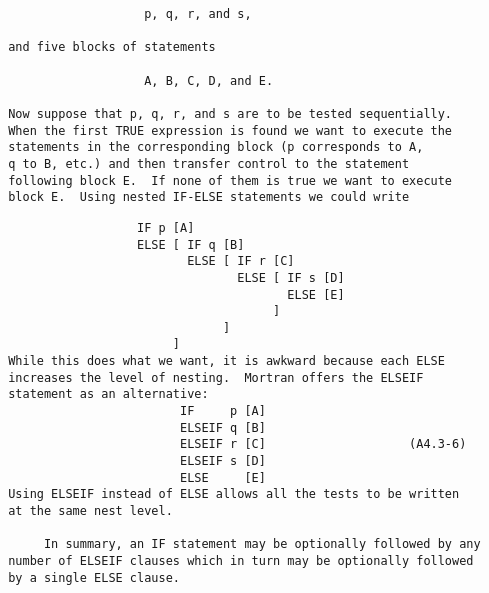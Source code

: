 \begin{verbatim}
                    p, q, r, and s,
 
 and five blocks of statements
 
                    A, B, C, D, and E.
 
 Now suppose that p, q, r, and s are to be tested sequentially.
 When the first TRUE expression is found we want to execute the
 statements in the corresponding block (p corresponds to A,
 q to B, etc.) and then transfer control to the statement
 following block E.  If none of them is true we want to execute
 block E.  Using nested IF-ELSE statements we could write
 \end{verbatim}
\newpage
 \begin{verbatim}
                   IF p [A]
                   ELSE [ IF q [B]
                          ELSE [ IF r [C]
                                 ELSE [ IF s [D]
                                        ELSE [E]
                                      ]
                               ]
                        ]
 While this does what we want, it is awkward because each ELSE
 increases the level of nesting.  Mortran offers the ELSEIF
 statement as an alternative:
                         IF     p [A]
                         ELSEIF q [B]
                         ELSEIF r [C]                    (A4.3-6)
                         ELSEIF s [D]
                         ELSE     [E]
 Using ELSEIF instead of ELSE allows all the tests to be written
 at the same nest level.
 
      In summary, an IF statement may be optionally followed by any
 number of ELSEIF clauses which in turn may be optionally followed
 by a single ELSE clause.
 \end{verbatim}
